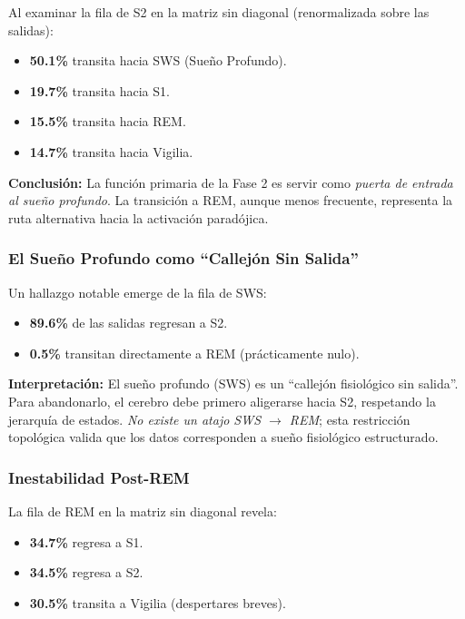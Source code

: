 Al examinar la fila de S2 en la matriz sin diagonal (renormalizada sobre las salidas):
\begin{itemize}
    \item \textbf{50.1\%} transita hacia SWS (Sueño Profundo).
    \item \textbf{19.7\%} transita hacia S1.
    \item \textbf{15.5\%} transita hacia REM.
    \item \textbf{14.7\%} transita hacia Vigilia.
\end{itemize}

\textbf{Conclusión:} La función primaria de la Fase 2 es servir como \textit{puerta de entrada al sueño profundo}. La transición a REM, aunque menos frecuente, representa la ruta alternativa hacia la activación paradójica.

\subsubsection{El Sueño Profundo como ``Callejón Sin Salida''}

Un hallazgo notable emerge de la fila de SWS:
\begin{itemize}
    \item \textbf{89.6\%} de las salidas regresan a S2.
    \item \textbf{0.5\%} transitan directamente a REM (prácticamente nulo).
\end{itemize}

\textbf{Interpretación:} El sueño profundo (SWS) es un ``callejón fisiológico sin salida''. Para abandonarlo, el cerebro debe primero aligerarse hacia S2, respetando la jerarquía de estados. \textit{No existe un atajo SWS $\rightarrow$ REM}; esta restricción topológica valida que los datos corresponden a sueño fisiológico estructurado.

\subsubsection{Inestabilidad Post-REM}

La fila de REM en la matriz sin diagonal revela:
\begin{itemize}
    \item \textbf{34.7\%} regresa a S1.
    \item \textbf{34.5\%} regresa a S2.
    \item \textbf{30.5\%} transita a Vigilia (despertares breves).
\end{itemize}

